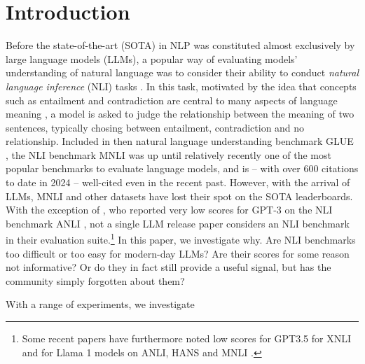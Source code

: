 \section{Introduction}

Before the state-of-the-art (SOTA) in NLP was constituted almost exclusively by large language models (LLMs), a popular way of evaluating models' understanding of natural language was to consider their ability to conduct \emph{natural language inference} (NLI) tasks \citep[most famously,][]{bowman-etal-2015-large,williams-etal-2018-broad}.
In this task, motivated by the idea that concepts such as entailment and contradiction are central to many aspects of language meaning \citep{bowman-etal-2015-large},  a model is asked to judge the relationship between the meaning of two sentences, typically chosing between entailment, contradiction and no relationship.
Included in then natural language understanding benchmark GLUE \citep{wang2019glue}, the NLI benchmark MNLI \citep{williams-etal-2018-broad} was up until relatively recently one of the most popular benchmarks to evaluate language models, and is -- with over 600 citations to date in 2024 -- well-cited even in the recent past.
However, with the arrival of LLMs, MNLI and other datasets have lost their spot on the SOTA leaderboards.
With the exception of \citet{brown2020language},  who reported very low scores for GPT-3 on the NLI benchmark ANLI \citep{nie-etal-2020-adversarial}, not a single LLM release paper considers an NLI benchmark in their evaluation suite.\footnote{Some recent papers have furthermore noted low scores for GPT3.5 for XNLI \citep{ohmer2024form,ohmer-etal-2023-separating} and for Llama 1 models on ANLI, HANS \citep{mccoy-etal-2019-right} and MNLI \citep{weber-etal-2023-mind}.}
In this paper, we investigate why.
Are NLI benchmarks too difficult or too easy for modern-day LLMs?
Are their scores for some reason not informative?
Or do they in fact still provide a useful signal, but has the community simply forgotten about them?

With a range of experiments, we investigate 


